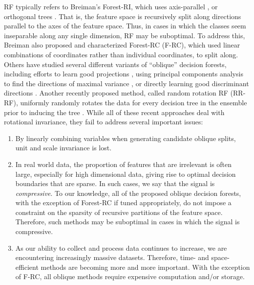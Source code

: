RF typically refers to Breiman's Forest-RI, which uses axis-parallel \cite{Heath1993}, or orthogonal trees \cite{Menze2011}. That is, the feature space is recursively split along directions parallel to the axes of the feature space. Thus, in cases in which the classes seem inseparable along any single dimension, RF may be suboptimal. To address this, Breiman also proposed and characterized Forest-RC (F-RC), which used linear combinations of coordinates rather than individual coordinates, to split along. Others have studied several different variants of ``oblique'' decision forests, including efforts to learn good projections \cite{Heath1993,Tan2005}, using principal components analysis to find the directions of maximal variance \cite{Ho1998,Rodriguez2006}, or directly learning good discriminant directions \cite{Menze2011}. Another recently proposed method, called random rotation RF (RR-RF), uniformly randomly rotates the data for every decision tree in the ensemble prior to inducing the tree \cite{Blaser2016}. While all of these recent approaches deal with rotational invariance, they fail to address several important issues:

\begin{enumerate}
\item By linearly combining variables when generating candidate oblique splits, unit and scale invariance is lost.
\item In real world data, the proportion of features that are irrelevant is often large, especially for high dimensional data, giving rise to optimal decision boundaries that are sparse. In such cases, we say that the signal is \emph{compressive}. To our knowledge, all of the proposed oblique decision forests, with the exception of Forest-RC if tuned appropriately, do not impose a constraint on the sparsity of recursive partitions of the feature space. Therefore, such methods may be suboptimal in cases in which the signal is compressive.
\item As our ability to collect and process data continues to increase, we are encountering increasingly massive datasets. Therefore, time- and space-efficient methods are becoming more and more important. With the exception of F-RC, all oblique methods require expensive computation and/or storage.
\end{enumerate}

